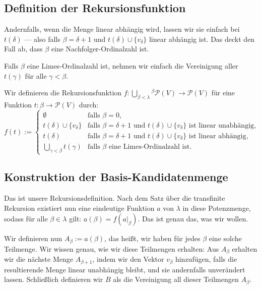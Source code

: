 \subsection{Definition der Rekursionsfunktion}
\begin{spoken-clean}[00:43:40 - 00:45:50]
Andernfalls, wenn die Menge linear abhängig wird, lassen wir sie einfach bei $t(\delta)$ --- also falls $\beta = \delta + 1$ und $t(\delta) \cup \{v_\delta\}$ linear abhängig ist. Das deckt den Fall ab, dass $\beta$ eine Nachfolger-Ordinalzahl ist.

Falls $\beta$ eine Limes-Ordinalzahl ist, nehmen wir einfach die Vereinigung aller $t(\gamma)$ für alle $\gamma < \beta$.
\end{spoken-clean}

\begin{math-stroke}
Wir definieren die Rekursionsfunktion $f \colon \bigcup_{\beta < \lambda} {}^{\displaystyle \beta}\!\mathcal{P}(V) \to \mathcal{P}(V)$ für eine Funktion $t \colon \beta \to \mathcal{P}(V)$ durch:
\begin{equation}\label{eq:basis-rekursion-f-actual}
f(t) := \begin{cases}
\emptyset & \text{falls } \beta = 0, \\[6pt]
t(\delta) \cup \{v_\delta\} & \text{falls } \beta = \delta + 1 \text{ und } t(\delta) \cup \{v_\delta\} \text{ ist linear unabhängig}, \\[6pt]
t(\delta) & \text{falls } \beta = \delta + 1 \text{ und } t(\delta) \cup \{v_\delta\} \text{ ist linear abhängig}, \\[6pt]
\displaystyle\bigcup_{\gamma < \beta} t(\gamma) & \text{falls } \beta \text{ eine Limes-Ordinalzahl ist}.
\end{cases}
\end{equation}
\end{math-stroke}

\subsection{Konstruktion der Basis-Kandidatenmenge}
\begin{spoken-clean}[00:45:50 - 00:48:05]
Das ist unsere Rekursionsdefinition. Nach dem Satz über die transfinite Rekursion existiert nun eine eindeutige Funktion $a$ von $\lambda$ in diese Potenzmenge, sodass für alle $\beta \in \lambda$ gilt: $a(\beta) = f(a|_{\beta})$. Das ist genau das, was wir wollen.

Wir definieren nun $A_\beta := a(\beta)$, das heißt, wir haben für jedes $\beta$ eine solche Teilmenge. Wir wissen genau, wie wir diese Teilmengen erhalten: Aus $A_\beta$ erhalten wir die nächste Menge $A_{\beta+1}$, indem wir den Vektor $v_\beta$ hinzufügen, falls die resultierende Menge linear unabhängig bleibt, und sie andernfalls unverändert lassen. Schließlich definieren wir $B$ als die Vereinigung all dieser Teilmengen $A_\beta$.
\end{spoken-clean}

